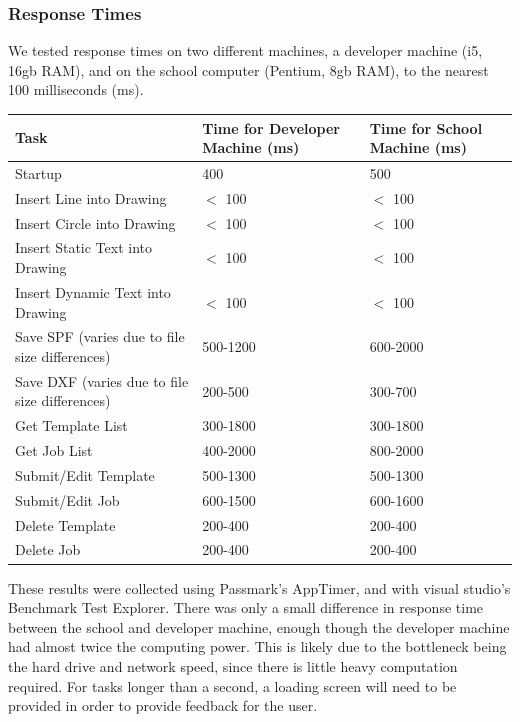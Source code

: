 \documentclass[oneside,openany,11pt,a4paper]{report}
\begin{document}
\subsubsection{Response Times}
We tested response times on two different machines, a developer machine (i5, 16gb RAM), and on the school computer (Pentium, 8gb RAM), to the nearest 100 milliseconds (ms).
\begin{longtable}{|p{7cm}|p{3cm}|p{3cm}|}
	\hline
	\rowcolor{gray!50}
	\textbf{Task} & \textbf{Time for Developer Machine (ms)} &  \textbf{Time for School Machine (ms)}  \\ \hline
	Startup & 400 & 500  \\ \hline

	Insert Line into Drawing & $<$ 100 & $<$ 100  \\ \hline
	Insert Circle into Drawing & $<$ 100 & $<$ 100  \\ \hline
	Insert Static Text into Drawing & $<$ 100 & $<$ 100  \\ \hline
	Insert Dynamic Text into Drawing & $<$ 100 & $<$ 100  \\ \hline
	
	Save SPF (varies due to file size differences) & 500-1200 & 600-2000  \\ \hline
	Save DXF (varies due to file size differences) & 200-500 & 300-700 \\ \hline
	
	Get Template List & 300-1800 & 300-1800  \\ \hline
	Get Job List & 400-2000 & 800-2000  \\ \hline

	Submit/Edit Template & 500-1300 & 500-1300 \\ \hline
	Submit/Edit Job & 600-1500 & 600-1600  \\ \hline
	
	Delete Template & 200-400 & 200-400 \\ \hline
	Delete Job & 200-400 & 200-400  \\ \hline
\end{longtable}

These results were collected using Passmark's AppTimer, and with visual studio's Benchmark Test Explorer. 
There was only a small difference in response time between the school and developer machine, enough though the developer machine had almost twice the computing power. This is likely due to the bottleneck being the hard drive and network speed, since there is little heavy computation required. For tasks longer than a second, a loading screen will need to be provided in order to provide feedback for the user. 
\end{document}
